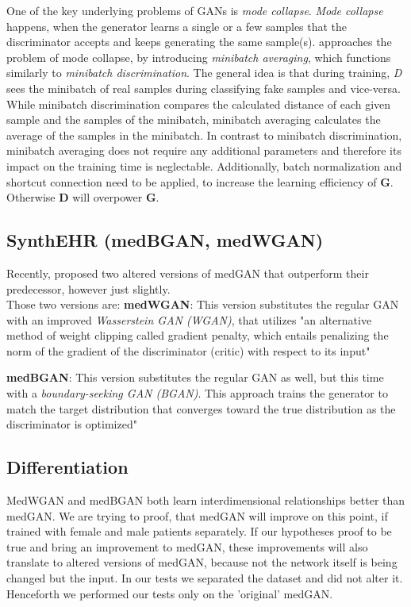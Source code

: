 \documentclass[11pt, a4paper]{book}
\begin{document}
One of the key underlying problems of GANs is \textit{mode collapse}. \textit{Mode collapse} happens, when the generator learns a single or a few samples that the discriminator accepts and keeps generating the same sample(s).
\cite{Choi2017} approaches the problem of mode collapse, by introducing \textit{minibatch averaging}, which functions similarly to \textit{minibatch discrimination}. The general idea is that during training, \textit{D} sees the minibatch of real samples during classifying fake samples and vice-versa.
While minibatch discrimination compares the calculated distance of each given sample and the samples of the minibatch, minibatch averaging calculates the average of the samples in the minibatch. In contrast to minibatch discrimination, minibatch averaging does not require any additional parameters and therefore its impact on the training time is neglectable. \cite{Choi2017}
Additionally, batch normalization and shortcut connection need to be applied, to increase the learning efficiency of \textbf{G}. Otherwise \textbf{D} will overpower \textbf{G}. \cite{Choi2017}

\subsection{SynthEHR (medBGAN, medWGAN)}
Recently, \cite{Baowaly2018} proposed two altered versions of medGAN that outperform their predecessor, however just slightly.
\\
Those two versions are:
\textbf{medWGAN}: This version substitutes the regular GAN with an improved \textit{Wasserstein GAN (WGAN)}, that utilizes "an alternative method of weight clipping called gradient penalty, which entails penalizing the norm of the gradient of the discriminator (critic) with respect to its input" \cite{Baowaly2018}

\textbf{medBGAN}: This version substitutes the regular GAN as well, but this time with a \textit{boundary-seeking GAN (BGAN)}. This approach trains the generator to match the target distribution that converges toward the true distribution as the discriminator is optimized" \cite{Baowaly2018}
\subsection{Differentiation}
MedWGAN and medBGAN both learn interdimensional relationships better than medGAN. We are trying to proof, that medGAN will improve on this point, if trained with female and male patients separately.
If our hypotheses proof to be true and bring an improvement to medGAN, these improvements will also translate to altered versions of medGAN, because not the network itself is being changed but the input. In our tests we separated the dataset and did not alter it. Henceforth we performed our tests only on the 'original' medGAN. 
\end{document}
